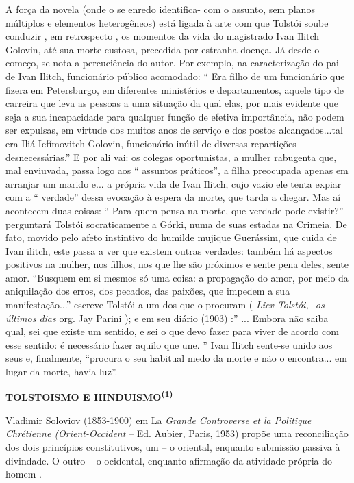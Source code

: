 A força da novela (onde o se enredo identifica- com o assunto, sem
planos múltiplos e elementos heterogêneos) está ligada à arte com que
Tolstói soube conduzir , em retrospecto , os momentos da vida do
magistrado Ivan Ilitch Golovin, até sua morte custosa, precedida por
estranha doença. Já desde o começo, se nota a percuciência do autor. Por
exemplo, na caracterização do pai de Ivan Ilitch, funcionário público
acomodado: `` Era filho de um funcionário que fizera em Petersburgo, em
diferentes ministérios e departamentos, aquele tipo de carreira que leva
as pessoas a uma situação da qual elas, por mais evidente que seja a sua
incapacidade para qualquer função de efetiva importância, não podem ser
expulsas, em virtude dos muitos anos de serviço e dos postos
alcançados...tal era Iliá Iefímovitch Golovin, funcionário inútil de
diversas repartições desnecessárias.'' E por ali vai: os colegas
oportunistas, a mulher rabugenta que, mal enviuvada, passa logo aos ``
assuntos práticos'', a filha preocupada apenas em arranjar um marido
e... a própria vida de Ivan Ilitch, cujo vazio ele tenta expiar com a ``
verdade'' dessa evocação à espera da morte, que tarda a chegar. Mas aí
acontecem duas coisas: `` Para quem pensa na morte, que verdade pode
existir?'' perguntará Tolstói socraticamente a Górki, numa de suas
estadas na Crimeia. De fato, movido pelo afeto instintivo do humilde
mujique Guerássim, que cuida de Ivan ilitch, este passa a ver que
existem outras verdades: também há aspectos positivos na mulher, nos
filhos, nos que lhe são próximos e sente pena deles, sente amor.
``Busquem em si mesmos só uma coisa: a propagação do amor, por meio da
aniquilação dos erros, dos pecados, das paixões, que impedem a sua
manifestação...'' escreve Tolstói a um dos que o procuram ( \emph{Liev
Tolstói,- os últimos dias} org. Jay Parini ); e em seu diário (1903) :''
... Embora não saiba qual, sei que existe um sentido, e sei o que devo
fazer para viver de acordo com esse sentido: é necessário fazer aquilo
que une. '' Ivan Ilitch sente-se unido aos seus e, finalmente, ``procura
o seu habitual medo da morte e não o encontra... em lugar da morte,
havia luz''.

\textbf{TOLSTOISMO E HINDUISMO\textsuperscript{(1)}}

Vladimir Soloviov (1853-1900) em La \emph{Grande Controverse et la
Politique Chrétienne (Orient-Occident} -- Ed. Aubier, Paris, 1953)
propõe uma reconciliação dos dois princípios constitutivos, um -- o
oriental, enquanto submissão passiva à divindade. O outro -- o
ocidental, enquanto afirmação da atividade própria do homem .

